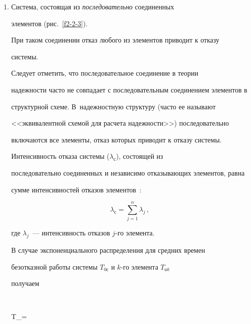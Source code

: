      \begin{enumerate}


     \item  Система, состоящая из \textit{последовательно} соединенных 


элементов (рис.~\ref{f2-2-3}).


     


     При таком соединении отказ любого из элементов приводит к отказу 


системы.


     


     Следует отметить, что последовательное соединение в теории 


надежности часто не совпадает с последовательным соединением элементов в 


структурной схеме. В~надежностную структуру (часто ее называют 


<<эквивалентной схемой для расчета надежности>>) последовательно 


включаются все элементы, отказ которых приводит к отказу системы.


     


     Интенсивность отказа системы ($\lambda_{\mathrm{с}}$), состоящей из 


последовательно соединенных и независимо отказывающих элементов, равна 


сумме интенсивностей отказов элементов~\cite{8-2-3}:


     \begin{equation}


     \lambda_{\mathrm{с}} = \sum\limits_{j=1}^n \lambda_j\,,


     \label{e2-2-3}


     \end{equation}


где $\lambda_j$~--- интенсивность отказов $j$-го элемента.


     


     В случае экспоненциального распределения  для средних времен 


безотказной работы системы $T_{\mathrm{0с}}$ и $k$-го элемента $T_{\mathrm{о}k}$ 


получаем


     $$


     T_{}=



\end{enumerate}
